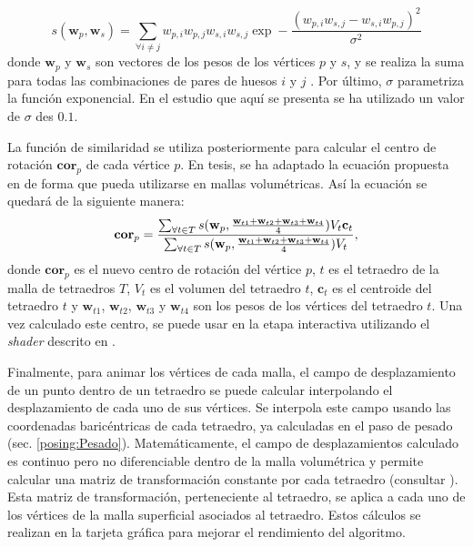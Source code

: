 \begin{equation}
\label{similarity}
 s(\textbf{w}_p,\textbf{w}_s) = 
\sum_{\forall i \neq j} w_{p,i}w_{p,j}w_{s,i}w_{s,j}\exp-\frac{(w_{p,i}w_{s,j}-w_{s,i}w_{p,j})^2}{\sigma^2}
\end{equation}
\normalsize
%
donde $\textbf{w}_p$ y $\textbf{w}_s$ son vectores de los pesos de los vértices $p$ y $s$, y se realiza la suma para todas las combinaciones de pares de huesos $i$ y $j$ . Por último, $\sigma$ parametriza la función exponencial. 
En el estudio que aquí se presenta se ha utilizado un valor de  $\sigma$ des $0.1$. 

La función de similaridad se utiliza posteriormente para calcular el centro de rotación $\textbf{cor}_p$ de cada vértice $p$. En   tesis, se ha adaptado la ecuación  propuesta en \cite{le2016real} de forma que pueda utilizarse en mallas volumétricas. Así la ecuación se quedará de la siguiente manera: 
%
\begin{equation}
\textbf{cor}_p = 
\frac
  {
  \sum_{\forall t \in T}
    s(\textbf{w}_p,
      \frac{\textbf{w}_{t1}+\textbf{w}_{t2}+\textbf{w}_{t3}+\textbf{w}_{t4}}{4})
    V_t\mathbf{c}_t
  }
  {
  \sum_{\forall t \in T}
    s(\textbf{w}_p,
      \frac{\textbf{w}_{t1}+\textbf{w}_{t2}+\textbf{w}_{t3}+\textbf{w}_{t4}}{4})
    V_t
  } ,
\normalsize
\end{equation}
%
donde $\textbf{cor}_p$ es el nuevo centro de rotación del vértice $p$, $t$ es el tetraedro de la malla de tetraedros $T$, $V_t$ es el volumen del tetraedro $t$, $\textbf{c}_t$ es el centroide del tetraedro $t$ y $\textbf{w}_{t1}$, $\textbf{w}_{t2}$, $\textbf{w}_{t3}$ y $\textbf{w}_{t4}$ son los pesos de los vértices del tetraedro $t$. Una vez calculado este centro, se puede usar en la etapa interactiva utilizando el \emph{shader} descrito en \cite{le2016real}.

Finalmente, para animar los vértices de cada malla, el campo de desplazamiento de un punto dentro de un tetraedro se puede calcular interpolando el desplazamiento de cada uno de sus vértices. Se interpola este campo usando las coordenadas baricéntricas de cada tetraedro, ya calculadas en el paso de pesado (sec. \ref{posing:Pesado}). Matemáticamente, el campo de desplazamientos calculado es continuo pero no diferenciable dentro de la malla volumétrica y permite calcular una matriz de transformación constante por cada tetraedro (consultar \cite{Muller2004}). Esta matriz de transformación, perteneciente al tetraedro, se aplica a cada uno de los vértices de la malla superficial asociados al tetraedro. Estos cálculos se realizan en la tarjeta gráfica para mejorar el rendimiento del algoritmo.

